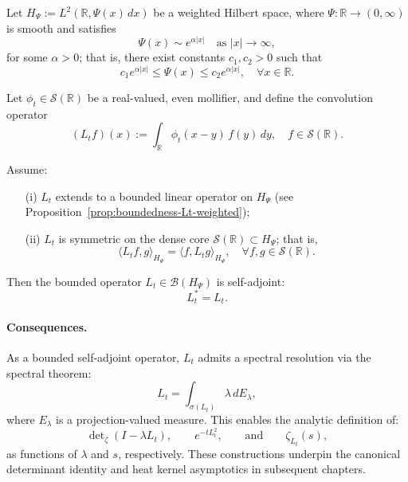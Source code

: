 \begin{proposition}
\label{prop:selfadjointness-Lt}
Let \( H_\Psi := L^2(\mathbb{R}, \Psi(x)\, dx) \) be a weighted Hilbert space, where \( \Psi \colon \mathbb{R} \to (0,\infty) \) is smooth and satisfies
\[
\Psi(x) \sim e^{\alpha|x|} \quad \text{as } |x| \to \infty,
\]
for some \( \alpha > 0 \); that is, there exist constants \( c_1, c_2 > 0 \) such that
\[
c_1 e^{\alpha |x|} \le \Psi(x) \le c_2 e^{\alpha |x|}, \quad \forall x \in \mathbb{R}.
\]

Let \( \phi_t \in \mathcal{S}(\mathbb{R}) \) be a real-valued, even mollifier, and define the convolution operator
\[
(L_t f)(x) := \int_{\mathbb{R}} \phi_t(x - y)\, f(y)\, dy, \quad f \in \mathcal{S}(\mathbb{R}).
\]

Assume:
\begin{itemize}
    \item[\textup{(i)}] \( L_t \) extends to a bounded linear operator on \( H_\Psi \) (see Proposition~\ref{prop:boundedness-Lt-weighted});
    \item[\textup{(ii)}] \( L_t \) is symmetric on the dense core \( \mathcal{S}(\mathbb{R}) \subset H_\Psi \); that is,
    \[
    \langle L_t f, g \rangle_{H_\Psi} = \langle f, L_t g \rangle_{H_\Psi}, \quad \forall f, g \in \mathcal{S}(\mathbb{R}).
    \]
\end{itemize}

Then the bounded operator \( L_t \in \mathcal{B}(H_\Psi) \) is self-adjoint:
\[
L_t^* = L_t.
\]

\paragraph{Consequences.}
As a bounded self-adjoint operator, \( L_t \) admits a spectral resolution via the spectral theorem:
\[
L_t = \int_{\sigma(L_t)} \lambda\, dE_\lambda,
\]
where \( E_\lambda \) is a projection-valued measure. This enables the analytic definition of:
\[
\det\nolimits_\zeta(I - \lambda L_t), \qquad e^{-t L_t^2}, \qquad \text{and} \qquad \zeta_{L_t}(s),
\]
as functions of \( \lambda \) and \( s \), respectively. These constructions underpin the canonical determinant identity and heat kernel asymptotics in subsequent chapters.
\end{proposition}
